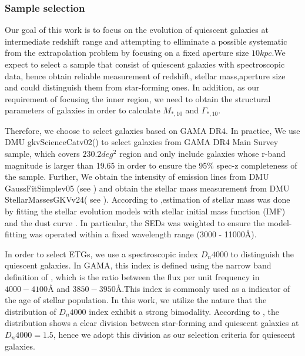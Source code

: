 \documentclass[fleqn,usenatbib]{mnras}
\begin{document}
\subsubsection{Sample selection}
\par Our goal of this work is to focus on the evolution of quiescent galaxies at intermediate redshift range and attempting to elliminate a possible systematic from the extrapolation problem by focusing on a fixed aperture size $10kpc$.We expect to select a sample that consist of quiescent galaxies with spectroscopic data, hence obtain reliable measurement of redshift, stellar mass,aperture size and could distinguish them from star-forming ones. In addition, as our requirement of focusing the inner region, we need to obtain the structural parameters of galaxies in order to calculate $M_{*,10}$ and $\Gamma_{*,10}$.
\par Therefore, we choose to select galaxies based on GAMA DR4. 
In practice, We  use DMU gkvScienceCatv02(\cite{bellstedt_galaxy_2020}) to select galaxies from GAMA DR4 Main Survey sample, which covers $230.2 deg^2$ region and only include galaxies whose r-band magnitude is larger than 19.65 in order to ensure the 95\% spec-z completeness of the sample. Further, We obtain the intensity of emission lines from DMU GaussFitSimplev05 (see \cite{Gordon_GAMAspecline_2017}) and obtain the stellar mass measurement from DMU StellarMassesGKVv24( see \cite{GAMAmain}). According to \cite{Taylor2011},estimation of stellar mass was done by fitting the \cite{bruzual_2003} stellar evolution models with \cite{chabrier2003} stellar initial mass function (IMF) and the \cite{calzetti2000} dust curve . In particular, the SEDs was weighted to ensure the model-fitting was operated within a fixed wavelength range (3000 - 11000\r{A}). 
\par In order to select ETGs, we use a spectroscopic index $D_n4000$ to distinguish the quiescent galaxies. In GAMA, this index is defined using the narrow band definition of \cite{Balogh99}, which is the ratio between the flux per unit frequency in $4000-4100$\r{A} and $3850-3950$\r{A}.This index is commonly used as a indicator of the age of stellar population. In this work, we utilize the nature that the distribution of $D_n4000$ index exhibit a strong bimodality. According to \cite{Kauffmann2003}, the distribution shows a clear division between star-forming and quiescent galaxies at $D_n4000 = 1.5$, hence we adopt this division as our selection criteria for quiescent galaxies. 
\end{document}
